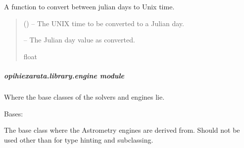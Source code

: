 \documentclass[letterpaper,11pt,english]{sphinxmanual}
\begin{document}
\begin{savenotes}\begin{fulllineitems}
\label{\detokenize{code/opihiexarata.library.conversion:opihiexarata.library.conversion.unix_time_to_julian_day}}
\pysigstartsignatures
{}
\pysigstopsignatures
\sphinxAtStartPar
A function to convert between julian days to Unix time.
\begin{quote}\begin{description}
\sphinxAtStartPar
{} () – The UNIX time to be converted to a Julian day.

\sphinxAtStartPar
{} – The Julian day value as converted.

\sphinxAtStartPar
float

\end{description}\end{quote}

\end{fulllineitems}\end{savenotes}


\sphinxstepscope


\subparagraph{opihiexarata.library.engine module}
\label{\detokenize{code/opihiexarata.library.engine:module-opihiexarata.library.engine}}\label{\detokenize{code/opihiexarata.library.engine:opihiexarata-library-engine-module}}\label{\detokenize{code/opihiexarata.library.engine::doc}}
\sphinxAtStartPar
Where the base classes of the solvers and engines lie.

\begin{savenotes}\begin{fulllineitems}
\label{\detokenize{code/opihiexarata.library.engine:opihiexarata.library.engine.AstrometryEngine}}
\pysigstartsignatures
{}
\pysigstopsignatures
\sphinxAtStartPar
Bases: {\hyperref[\detokenize{code/opihiexarata.library.engine:opihiexarata.library.engine.ExarataEngine}]{}}

\sphinxAtStartPar
The base class where the Astrometry engines are derived from. Should
not be used other than for type hinting and subclassing.

\end{fulllineitems}\end{savenotes}
\end{document}
